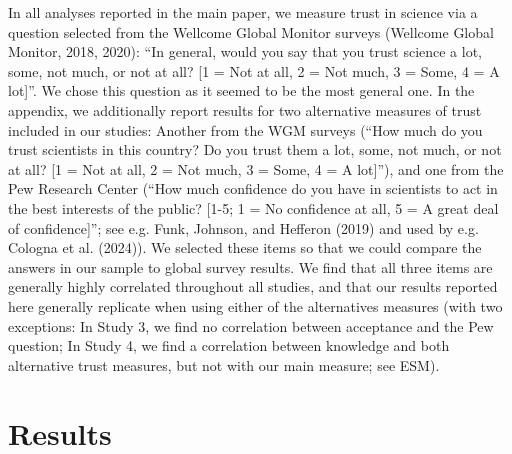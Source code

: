 \documentclass[
  doc,floatsintext]{apa6}
\begin{document}
In all analyses reported in the main paper, we measure trust in science via a question selected from the Wellcome Global Monitor surveys (Wellcome Global Monitor, 2018, 2020): ``In general, would you say that you trust science a lot, some, not much, or not at all? {[}1 = Not at all, 2 = Not much, 3 = Some, 4 = A lot{]}''. We chose this question as it seemed to be the most general one. In the appendix, we additionally report results for two alternative measures of trust included in our studies: Another from the WGM surveys (``How much do you trust scientists in this country? Do you trust them a lot, some, not much, or not at all? {[}1 = Not at all, 2 = Not much, 3 = Some, 4 = A lot{]}''), and one from the Pew Research Center (``How much confidence do you have in scientists to act in the best interests of the public? {[}1-5; 1 = No confidence at all, 5 = A great deal of confidence{]}''; see e.g. Funk, Johnson, and Hefferon (2019) and used by e.g. Cologna et al. (2024)). We selected these items so that we could compare the answers in our sample to global survey results. We find that all three items are generally highly correlated throughout all studies, and that our results reported here generally replicate when using either of the alternatives measures (with two exceptions: In Study 3, we find no correlation between acceptance and the Pew question; In Study 4, we find a correlation between knowledge and both alternative trust measures, but not with our main measure; see ESM).

\section{Results}\label{results}
\end{document}
